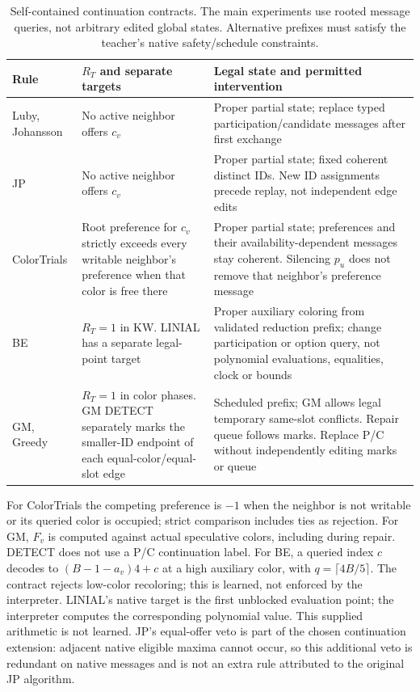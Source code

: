 \begin{table}[htbp]\centering\small
\begin{tabular}{p{.18\linewidth}p{.38\linewidth}p{.35\linewidth}}
\toprule Rule & $R_T$ and separate targets & Legal state and permitted intervention \\
\midrule
Luby, Johansson & No active neighbor offers $c_v$ & Proper partial state;
replace typed participation/candidate messages after first exchange \\
JP & No active neighbor offers $c_v$ & Proper partial state; fixed coherent
distinct IDs. New ID assignments precede replay, not independent edge edits \\
ColorTrials & Root preference for $c_v$ strictly exceeds every writable
neighbor's preference when that color is free there & Proper partial state;
preferences and their availability-dependent messages stay coherent.
Silencing $p_u$ does not remove that neighbor's preference message \\
BE & $R_T=1$ in KW. LINIAL has a separate legal-point target & Proper
auxiliary coloring from validated reduction prefix; change participation or option query,
not polynomial evaluations, equalities, clock or bounds \\
GM, Greedy & $R_T=1$ in color phases. GM DETECT separately marks the
smaller-ID endpoint of each equal-color/equal-slot edge & Scheduled
prefix; GM allows legal temporary same-slot conflicts. Repair queue follows
marks. Replace P/C without independently editing marks or queue \\
\bottomrule
\end{tabular}
\caption{Self-contained continuation contracts. The main experiments use
rooted message queries, not arbitrary edited global states. Alternative
prefixes must satisfy the teacher's native safety/schedule constraints.}
\label{tab:contracts}
\end{table}
For ColorTrials the competing preference is $-1$ when the neighbor is not
writable or its queried color is occupied; strict comparison includes ties
as rejection. For GM, $F_v$ is computed against actual speculative colors,
including during repair. DETECT does not use a P/C continuation label.
For BE, a queried index $c$ decodes to $(B-1-a_v)4+c$ at a high auxiliary
color, with $q=\lceil4B/5\rceil$. The contract rejects low-color recoloring;
this is learned, not enforced by the interpreter. LINIAL's native target is
the first unblocked evaluation point; the interpreter computes the corresponding
polynomial value. This supplied arithmetic is not learned. JP's equal-offer
veto is part of the chosen continuation extension: adjacent native eligible
maxima cannot occur, so this additional veto is redundant on native messages
and is not an extra rule attributed to the original JP algorithm.

